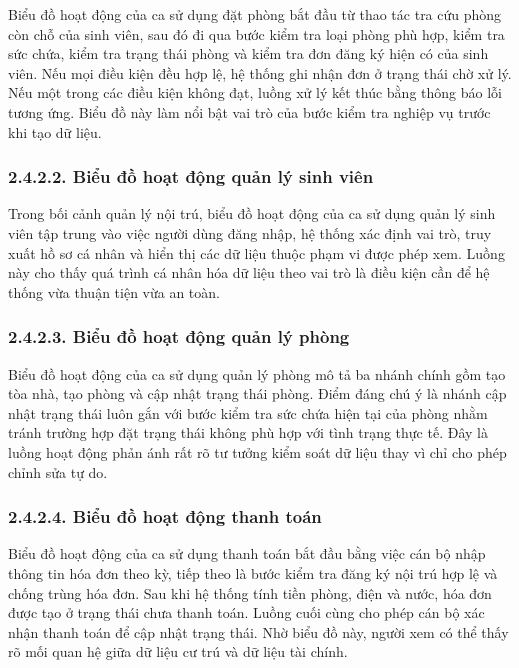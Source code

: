 \documentclass[12pt]{article}
\begin{document}
Biểu đồ hoạt động của ca sử dụng đặt phòng bắt đầu từ thao tác tra cứu phòng còn chỗ của sinh viên, sau đó đi qua bước kiểm tra loại phòng phù hợp, kiểm tra sức chứa, kiểm tra trạng thái phòng và kiểm tra đơn đăng ký hiện có của sinh viên. Nếu mọi điều kiện đều hợp lệ, hệ thống ghi nhận đơn ở trạng thái chờ xử lý. Nếu một trong các điều kiện không đạt, luồng xử lý kết thúc bằng thông báo lỗi tương ứng. Biểu đồ này làm nổi bật vai trò của bước kiểm tra nghiệp vụ trước khi tạo dữ liệu.

\subsubsection*{2.4.2.2. Biểu đồ hoạt động quản lý sinh viên}

Trong bối cảnh quản lý nội trú, biểu đồ hoạt động của ca sử dụng quản lý sinh viên tập trung vào việc người dùng đăng nhập, hệ thống xác định vai trò, truy xuất hồ sơ cá nhân và hiển thị các dữ liệu thuộc phạm vi được phép xem. Luồng này cho thấy quá trình cá nhân hóa dữ liệu theo vai trò là điều kiện cần để hệ thống vừa thuận tiện vừa an toàn.

\subsubsection*{2.4.2.3. Biểu đồ hoạt động quản lý phòng}

Biểu đồ hoạt động của ca sử dụng quản lý phòng mô tả ba nhánh chính gồm tạo tòa nhà, tạo phòng và cập nhật trạng thái phòng. Điểm đáng chú ý là nhánh cập nhật trạng thái luôn gắn với bước kiểm tra sức chứa hiện tại của phòng nhằm tránh trường hợp đặt trạng thái không phù hợp với tình trạng thực tế. Đây là luồng hoạt động phản ánh rất rõ tư tưởng kiểm soát dữ liệu thay vì chỉ cho phép chỉnh sửa tự do.

\subsubsection*{2.4.2.4. Biểu đồ hoạt động thanh toán}

Biểu đồ hoạt động của ca sử dụng thanh toán bắt đầu bằng việc cán bộ nhập thông tin hóa đơn theo kỳ, tiếp theo là bước kiểm tra đăng ký nội trú hợp lệ và chống trùng hóa đơn. Sau khi hệ thống tính tiền phòng, điện và nước, hóa đơn được tạo ở trạng thái chưa thanh toán. Luồng cuối cùng cho phép cán bộ xác nhận thanh toán để cập nhật trạng thái. Nhờ biểu đồ này, người xem có thể thấy rõ mối quan hệ giữa dữ liệu cư trú và dữ liệu tài chính.
\end{document}
